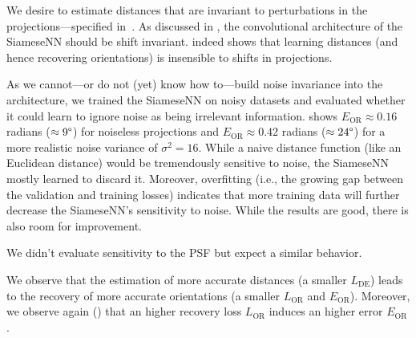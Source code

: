 

We desire to estimate distances that are invariant to perturbations in the projections---specified in~.
As discussed in , the convolutional architecture of the SiameseNN should be shift invariant.
 indeed shows that learning distances (and hence recovering orientations) is insensible to shifts in projections.

As we cannot---or do not (yet) know how to---build noise invariance into the architecture, we trained the SiameseNN on noisy datasets and evaluated whether it could learn to ignore noise as being irrelevant information.
 shows $E_\text{OR} \approx 0.16$ radians ($\approx 9\degree$) for noiseless projections and $E_\text{OR} \approx 0.42$ radians ($\approx 24\degree$) for a more realistic noise variance of $\sigma^2=16$.
While a naive distance function (like an Euclidean distance) would be tremendously sensitive to noise, the SiameseNN mostly learned to discard it.
Moreover, overfitting (i.e., the growing gap between the validation and training losses) indicates that more training data will further decrease the SiameseNN's sensitivity to noise.
While the results are good, there is also room for improvement.

We didn't evaluate sensitivity to the PSF but expect a similar behavior.

We observe that the estimation of more accurate distances (a smaller $L_\text{DE}$) leads to the recovery of more accurate orientations (a smaller $L_\text{OR}$ and $E_\text{OR}$).
Moreover, we observe again () that an higher recovery loss $L_\text{OR}$ induces an higher error $E_\text{OR}$.

